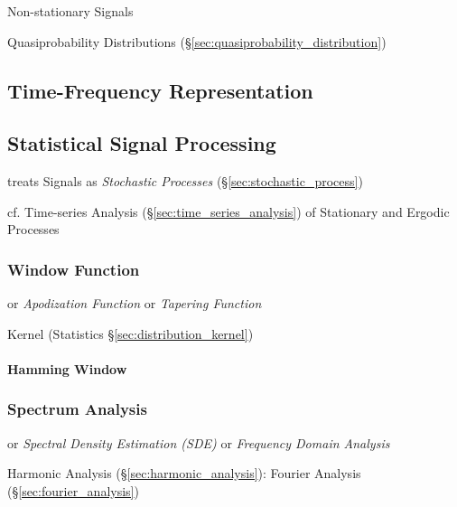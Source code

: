 Non-stationary Signals

\fist Quasiprobability Distributions
(\S\ref{sec:quasiprobability_distribution})



\subsection{Time-Frequency Representation}
\label{sec:time_frequency_representation}



\subsection{Statistical Signal Processing}\label{sec:statistical_signal}

treats Signals as \emph{Stochastic Processes} (\S\ref{sec:stochastic_process})

\fist cf. Time-series Analysis (\S\ref{sec:time_series_analysis}) of Stationary
and Ergodic Processes



\subsubsection{Window Function}\label{sec:window_function}

or \emph{Apodization Function} or \emph{Tapering Function}

\fist Kernel (Statistics \S\ref{sec:distribution_kernel})



\paragraph{Hamming Window}\label{sec:hamming_window}\hfill



\subsubsection{Spectrum Analysis}\label{sec:spectrum_analysis}

or \emph{Spectral Density Estimation (SDE)} or \emph{Frequency Domain Analysis}

Harmonic Analysis (\S\ref{sec:harmonic_analysis}): Fourier Analysis
(\S\ref{sec:fourier_analysis})

